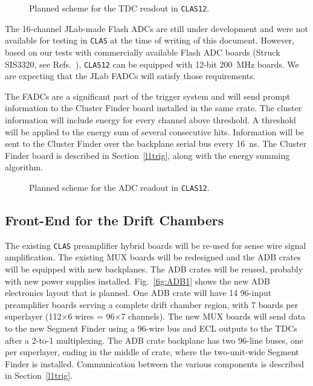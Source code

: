 \begin{figure}[ht]
\vspace{130mm}
\caption{\small{Planned scheme for the TDC readout in {\tt CLAS12}.}}
\label{fig:TDC1} 
\end{figure}

The 16-channel JLab-made Flash ADCs are still under development and were 
not available for testing in {\tt CLAS} at the time of writing of this
document.  However, based on our tests with commercially available Flash 
ADC boards (Struck SIS3320, see Refs.~\cite{pozd,smith}), {\tt CLAS12} can 
be equipped with 12-bit 200~MHz boards. We are expecting that the JLab 
FADCs will satisfy those requirements.

The FADCs are a significant part of the trigger system and will send
prompt information to the Cluster Finder board installed in the same
crate. The cluster information will include energy for every channel above 
threshold.  A threshold will be applied to the energy sum of several 
consecutive hits.  Information will be sent to the Cluster Finder over the 
backplane serial bus every 16~ns.  The Cluster Finder board is described 
in Section~\ref{l1trig}, along with the energy summing algorithm.

\begin{figure}[ht]
\vspace{130mm}
\caption{\small{Planned scheme for the ADC readout in {\tt CLAS12}.}}
\label{fig:ADC1} 
\end{figure}

\subsection{Front-End for the Drift Chambers}

The existing {\tt CLAS} preamplifier hybrid boards will be re-used for
sense wire signal amplification.  The existing MUX boards will be redesigned 
and the ADB crates will be equipped with new backplanes.  The ADB crates will 
be reused, probably with new power supplies installed.  Fig.~\ref{fig:ADB1} 
shows the new ADB electronics layout that is planned.  One ADB crate will have 
14 96-input preamplifier boards serving a complete drift chamber region, with 7 
boards per superlayer (112$\times$6 wires = 96$\times$7 channels).  The new MUX 
boards will send data to the new Segment Finder using a 96-wire bus and ECL
outputs to the TDCs after a 2-to-1 multiplexing.  The ADB crate backplane has 
two 96-line buses, one per superlayer, ending in the middle of crate, where the 
two-unit-wide Segment Finder is installed.  Communication between the various 
components is described in Section~\ref{l1trig}.

